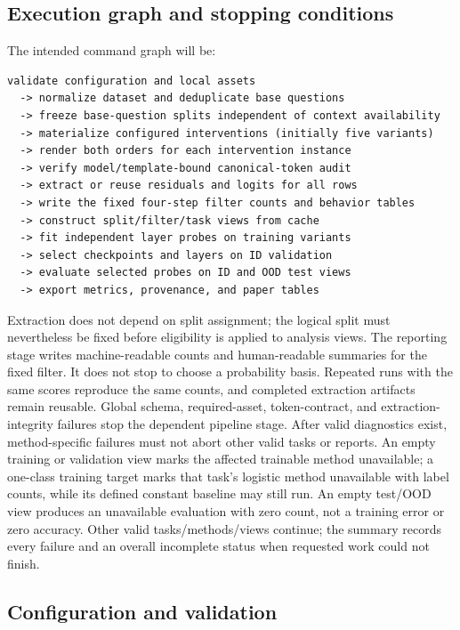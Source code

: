 \documentclass[11pt]{article}
\begin{document}
\subsection{Execution graph and stopping conditions}

The intended command graph will be:
\begin{verbatim}
validate configuration and local assets
  -> normalize dataset and deduplicate base questions
  -> freeze base-question splits independent of context availability
  -> materialize configured interventions (initially five variants)
  -> render both orders for each intervention instance
  -> verify model/template-bound canonical-token audit
  -> extract or reuse residuals and logits for all rows
  -> write the fixed four-step filter counts and behavior tables
  -> construct split/filter/task views from cache
  -> fit independent layer probes on training variants
  -> select checkpoints and layers on ID validation
  -> evaluate selected probes on ID and OOD test views
  -> export metrics, provenance, and paper tables
\end{verbatim}
Extraction does not depend on split assignment; the logical split must nevertheless be fixed before eligibility is applied to analysis views.
The reporting stage writes machine-readable counts and human-readable summaries for the fixed filter.
It does not stop to choose a probability basis.
Repeated runs with the same scores reproduce the same counts, and completed extraction artifacts remain reusable.
Global schema, required-asset, token-contract, and extraction-integrity failures stop the dependent pipeline stage.
After valid diagnostics exist, method-specific failures must not abort other valid tasks or reports.
An empty training or validation view marks the affected trainable method unavailable; a one-class training target marks that task's logistic method unavailable with label counts, while its defined constant baseline may still run.
An empty test/OOD view produces an unavailable evaluation with zero count, not a training error or zero accuracy.
Other valid tasks/methods/views continue; the summary records every failure and an overall incomplete status when requested work could not finish.

\subsection{Configuration and validation}
\end{document}
